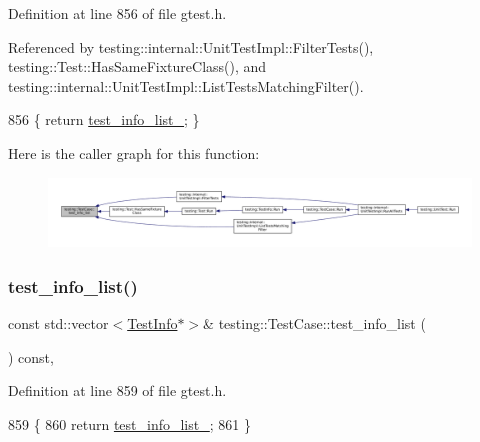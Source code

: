 Definition at line 856 of file gtest.\+h.



Referenced by testing\+::internal\+::\+Unit\+Test\+Impl\+::\+Filter\+Tests(), testing\+::\+Test\+::\+Has\+Same\+Fixture\+Class(), and testing\+::internal\+::\+Unit\+Test\+Impl\+::\+List\+Tests\+Matching\+Filter().


\begin{DoxyCode}
856 \{ \textcolor{keywordflow}{return} \hyperlink{classtesting_1_1TestCase_adce272a48399dd67a7bdd14fa7e99b80}{test\_info\_list\_}; \}
\end{DoxyCode}
Here is the caller graph for this function\+:
\nopagebreak
\begin{figure}[H]
\begin{center}
\leavevmode
\includegraphics[width=350pt]{classtesting_1_1TestCase_adbfcf952eb18dc82d4b20f6bc31aee04_icgraph}
\end{center}
\end{figure}
\mbox{\label{classtesting_1_1TestCase_a7b4460807b77fd63922528a76daf38ba}} 
\subsubsection{\texorpdfstring{test\+\_\+info\+\_\+list()}{test\_info\_list()}\hspace{0.1cm}{\footnotesize\ttfamily [2/2]}}
{\footnotesize\ttfamily const std\+::vector$<$\hyperlink{classtesting_1_1TestInfo}{Test\+Info}$\ast$$>$\& testing\+::\+Test\+Case\+::test\+\_\+info\+\_\+list (\begin{DoxyParamCaption}{ }\end{DoxyParamCaption}) const\hspace{0.3cm}{\ttfamily [inline]}, {\ttfamily [private]}}



Definition at line 859 of file gtest.\+h.


\begin{DoxyCode}
859                                                      \{
860     \textcolor{keywordflow}{return} \hyperlink{classtesting_1_1TestCase_adce272a48399dd67a7bdd14fa7e99b80}{test\_info\_list\_};
861   \}
\end{DoxyCode}
\mbox{\label{classtesting_1_1TestCase_a57f115315eb756e23be6651bb5e6c638}} 
